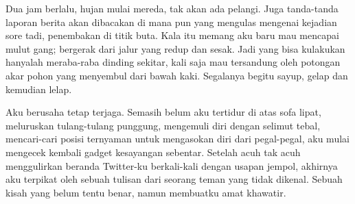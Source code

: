 \documentclass[smalldemyvopaper,11pt,twoside,onecolumn,openright,extrafontsizes]{memoir}
\begin{document}
Dua jam berlalu, hujan mulai mereda, tak akan ada pelangi. Juga tanda-tanda laporan berita akan dibacakan di mana pun yang mengulas mengenai kejadian sore tadi, penembakan di titik buta. Kala itu memang aku baru mau mencapai mulut gang; bergerak dari jalur yang redup dan sesak. Jadi yang bisa kulakukan hanyalah meraba-raba dinding sekitar, kali saja mau tersandung oleh potongan akar pohon yang menyembul dari bawah kaki. Segalanya begitu sayup, gelap dan kemudian lelap.



Aku berusaha tetap terjaga. Semasih belum aku tertidur di atas sofa lipat, meluruskan tulang-tulang punggung, mengemuli diri dengan selimut tebal, mencari-cari posisi ternyaman untuk mengasokan diri dari pegal-pegal, aku mulai mengecek kembali gadget kesayangan sebentar. Setelah acuh tak acuh menggulirkan beranda Twitter-ku berkali-kali dengan usapan jempol, akhirnya aku terpikat oleh sebuah tulisan dari seorang teman yang tidak dikenal. Sebuah kisah yang belum tentu benar, namun membuatku amat khawatir.



\end{document}
